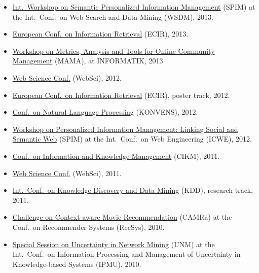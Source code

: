 \documentclass[line,margin]{res}
\begin{document}
\begin{resume}
\begin{itemize}
\item \href{http://spim-workshop.org/}{Int.\ Workshop on Semantic
  Personalized Information Management} (SPIM) at the Int.\ Conf.\ on Web
  Search and Data Mining (WSDM), 2013.  
\item \href{http://ecir2013.org/}{European Conf.\ on Information
  Retrieval} (ECIR), 2013.  
\item \href{http://mama.west.uni-koblenz.de/}{Workshop on Metrics,
  Analysis and Tools for Online Community Management} (MAMA), at
  INFORMATIK, 2013
\item \href{http://www.websci12.org/}{Web Science Conf.} (WebSci), 2012. 
\item \href{http://ecir2012.upf.edu/}{European Conf.\ on Information
  Retrieval} (ECIR), poster track, 2012.  
\item \href{http://www.oegai.at/konvens2012/}{Conf.\ on Natural Language
  Processing} (KONVENS), 2012. 
\item \href{http://spim-workshop.org/}{Workshop on Personalized
  Information Management: Linking Social and Semantic Web} (SPIM) at the
  Int.\ Conf.\ on Web Engineering (ICWE), 2012. 
\item \href{http://www.cikm2011.org/}{Conf.\ on Information and Knowledge
  Management} (CIKM), 2011.
\item \href{http://www.websci11.org/}{Web Science Conf.} (WebSci), 2011.
\item \href{http://www.sigkdd.org/kdd/2011/}{Int.\ Conf.\ on 
  Knowledge Discovery and Data Mining} (KDD), research track, 2011.
\item \href{http://www.dai-labor.de/camra2010/}{Challenge on
  Context-aware Movie Recommendation} (CAMRa) at the Conf.\ on  
  Recommender Systems (RecSys), 2010.   
\item \href{http://www.dai-labor.de/unm2010/}{Special Session on Uncertainty in Network Mining} (UNM) at the
  Int.\ Conf.\ on Information Processing and Management of
  Uncertainty in Knowledge-based Systems (IPMU), 2010. 
\end{itemize}


\end{resume}
\end{document}
